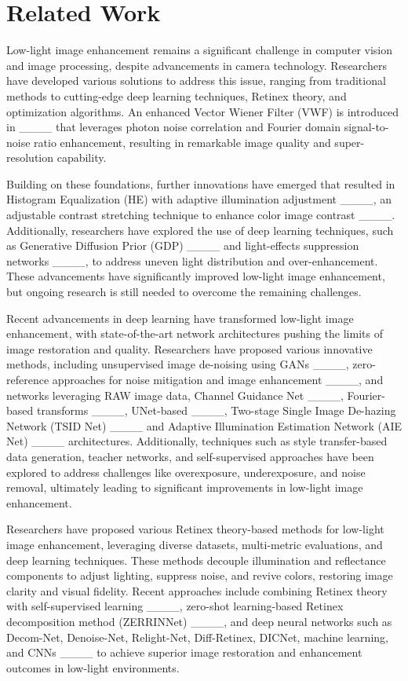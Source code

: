 \section{Related Work}
Low-light image enhancement remains a significant challenge in computer vision and image processing, despite advancements in camera technology. Researchers have developed various solutions to address this issue, ranging from traditional methods to cutting-edge deep learning techniques, Retinex theory, and optimization algorithms. An enhanced Vector Wiener Filter (VWF) is introduced in ____ that leverages photon noise correlation and Fourier domain signal-to-noise ratio enhancement, resulting in remarkable image quality and super-resolution capability.

Building on these foundations, further innovations have emerged that resulted in Histogram Equalization (HE) with adaptive illumination adjustment ____, an adjustable contrast stretching technique to enhance color image contrast ____. Additionally, researchers have explored the use of deep learning techniques, such as Generative Diffusion Prior (GDP) ____ and light-effects suppression networks ____, to address uneven light distribution and over-enhancement. These advancements have significantly improved low-light image enhancement, but ongoing research is still needed to overcome the remaining challenges.

Recent advancements in deep learning have transformed low-light image enhancement, with state-of-the-art network architectures pushing the limits of image restoration and quality. Researchers have proposed various innovative methods, including unsupervised image de-noising using GANs ____, zero-reference approaches for noise mitigation and image enhancement ____, and networks leveraging RAW image data, Channel Guidance Net ____, Fourier-based transforms ____, UNet-based ____, Two-stage Single Image De-hazing Network (TSID Net) ____ and Adaptive Illumination Estimation Network (AIE Net) ____ architectures. Additionally, techniques such as style transfer-based data generation, teacher networks, and self-supervised approaches have been explored to address challenges like overexposure, underexposure, and noise removal, ultimately leading to significant improvements in low-light image enhancement.

Researchers have proposed various Retinex theory-based methods for low-light image enhancement, leveraging diverse datasets, multi-metric evaluations, and deep learning techniques. These methods decouple illumination and reflectance components to adjust lighting, suppress noise, and revive colors, restoring image clarity and visual fidelity. Recent approaches include combining Retinex theory with self-supervised learning ____, zero-shot learning-based Retinex decomposition method (ZERRINNet) ____, and deep neural networks such as Decom-Net, Denoise-Net, Relight-Net, Diff-Retinex, DICNet, machine learning, and CNNs ____ to achieve superior image restoration and enhancement outcomes in low-light environments.